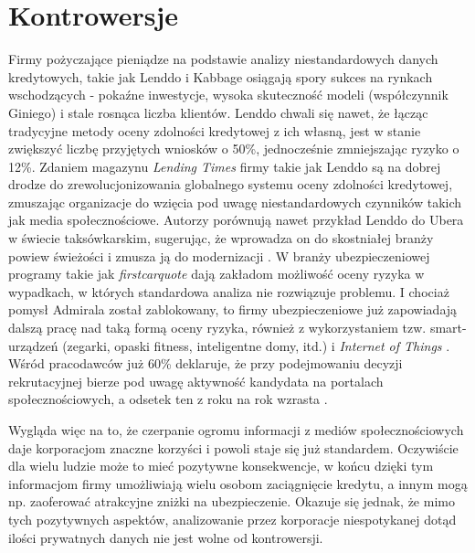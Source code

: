 \documentclass[polish]{kbk}
\begin{document}
\section{Kontrowersje}
Firmy pożyczające pieniądze na podstawie analizy niestandardowych danych kredytowych, takie jak Lenddo i Kabbage osiągają spory sukces na rynkach wschodzących - pokaźne inwestycje, wysoka skuteczność modeli (współczynnik Giniego) i stale rosnąca liczba klientów. Lenddo chwali się nawet, że łącząc tradycyjne metody oceny zdolności kredytowej z ich własną, jest w stanie zwiększyć liczbę przyjętych wniosków o 50\%, jednocześnie zmniejszając ryzyko o 12\%. Zdaniem magazynu \textit{Lending Times} firmy takie jak Lenddo są na dobrej drodze do zrewolucjonizowania globalnego systemu oceny zdolności kredytowej, zmuszając organizacje do wzięcia pod uwagę niestandardowych czynników takich jak media społecznościowe. Autorzy porównują nawet przykład Lenddo do Ubera w świecie taksówkarskim, sugerując, że wprowadza on do skostniałej branży powiew świeżości i zmusza ją do modernizacji \cite{lending-times}. W branży ubezpieczeniowej programy takie jak \textit{firstcarquote} dają zakładom możliwość oceny ryzyka w wypadkach, w których standardowa analiza nie rozwiązuje problemu. I chociaż pomysł Admirala został zablokowany, to firmy ubezpieczeniowe już zapowiadają dalszą pracę nad taką formą oceny ryzyka, również z wykorzystaniem tzw. smart-urządzeń (zegarki, opaski fitness, inteligentne domy, itd.) i \textit{Internet of Things} \cite{insurance-further}. Wśród pracodawców już 60\% deklaruje, że przy podejmowaniu decyzji rekrutacyjnej bierze pod uwagę aktywność kandydata na portalach społecznościowych, a odsetek ten z roku na rok wzrasta \cite{social-hiring}.

Wygląda więc na to, że czerpanie ogromu informacji z mediów społecznościowych daje korporacjom znaczne korzyści i powoli staje się już standardem. Oczywiście dla wielu ludzie może to mieć pozytywne konsekwencje, w końcu dzięki tym informacjom firmy umożliwiają wielu osobom zaciągnięcie kredytu, a innym mogą np. zaoferować atrakcyjne zniżki na ubezpieczenie. Okazuje się jednak, że mimo tych pozytywnych aspektów, analizowanie przez korporacje niespotykanej dotąd ilości prywatnych danych nie jest wolne od kontrowersji.
\end{document}
